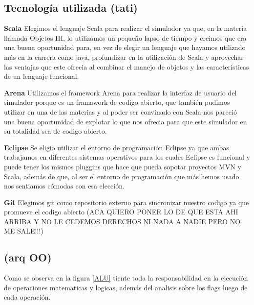 \subsection{Tecnología utilizada (tati)}

\item  \textbf{Scala}
Elegimos el lenguaje Scala para realizar el simulador ya que, en la materia llamada Objetos III, lo utilizamos un pequeño lapso de tiempo y creímos que era una buena oportunidad para, en vez de elegir un lenguaje que hayamos utilizado más en la carrera como java, profundizar en la utilización de Scala y aprovechar las ventajas que este ofrecia al combinar el manejo de objetos y las características de un lenguaje funcional.

\item  \textbf{Arena}
Utilizamos el framework Arena para realizar la interfaz de usuario del simulador porque es un framawork de codigo abierto, que también pudimos utilizar en una de las materias y al poder ser convinado con Scala nos pareció una buena oportunidad de explotar lo que nos ofrecia para que este simulador en su totalidad sea de codigo abierto.

\item  \textbf{Eclipse}
Se eligio utilizar el entorno de programación Eclipse ya que ambas trabajamos en diferentes sistemas operativos para los cuales Eclipse es funcional y puede tener los mismos pluggins que hace que pueda sopotar proyectos MVN y Scala, además de que, al ser el entorno de programación que más hemos usado nos sentiamos cómodas con esa elección.

\item  \textbf{Git}
Elegimos git como repositorio externo para sincronizar nuestro codigo ya que promueve el codigo abierto (ACA QUIERO PONER LO DE QUE ESTA AHI ARRIBA Y NO LE CEDEMOS DERECHOS NI NADA  A NADIE PERO NO ME SALE!!!)

\subsection{ (arq OO)}

Como se observa en la figura \ref{ALU} tiente toda la responsabilidad en la ejecución de operaciones matematicas y logicas, además del analisis sobre los flags luego de cada operación. 


